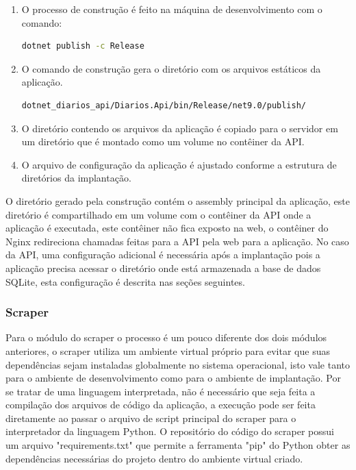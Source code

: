 \begin{enumerate}
    \item O processo de construção é feito na máquina de desenvolvimento com o comando:
\begin{lstlisting}[caption={}, label={run:dotnet_build}, language=bash]
dotnet publish -c Release
\end{lstlisting}\noindent
    \item O comando de construção gera o diretório com os arquivos estáticos da aplicação.
\begin{lstlisting}[caption={}, label={run:dotnet_build_dir}, language=bash]
dotnet_diarios_api/Diarios.Api/bin/Release/net9.0/publish/
\end{lstlisting}\noindent
    \item O diretório contendo os arquivos da aplicação é copiado para o servidor em um diretório que é montado como um volume no contêiner da API.
    \item O arquivo de configuração da aplicação é ajustado conforme a estrutura de diretórios da implantação.
\end{enumerate}

O diretório gerado pela construção contém o assembly principal da aplicação, este diretório é compartilhado em um volume com o contêiner da API onde a aplicação é executada, este contêiner não fica exposto na web, o contêiner do Nginx redireciona chamadas feitas para a API pela web para a aplicação. No caso da API, uma configuração adicional é necessária após a implantação pois a aplicação precisa acessar o diretório onde está armazenada a base de dados SQLite, esta configuração é descrita nas seções seguintes.

\subsubsection{Scraper}
Para o módulo do scraper o processo é um pouco diferente dos dois módulos anteriores, o scraper utiliza um ambiente virtual próprio para evitar que suas dependências sejam instaladas globalmente no sistema operacional, isto vale tanto para o ambiente de desenvolvimento como para o ambiente de implantação. Por se tratar de uma linguagem interpretada, não é necessário que seja feita a compilação dos arquivos de código da aplicação, a execução pode ser feita diretamente ao passar o arquivo de script principal do scraper para o interpretador da linguagem Python. O repositório do código do scraper possui um arquivo "requirements.txt" que permite a ferramenta "pip" do Python obter as dependências necessárias do projeto dentro do ambiente virtual criado.

